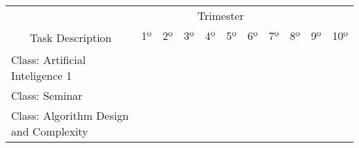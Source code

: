 \begin{table}[h]
\begin{tabular}{lllllllllll}
\hline
\multicolumn{1}{c}{}                                  & \multicolumn{8}{c}{Trimester}                                                                                                                                                                                                             &                                              &                          \\ \cline{2-11} 
\multicolumn{1}{c}{\multirow{2}{*}{Task Description}} & 1º                       & 2º                       & 3º                       & 4º                       & 5º                       & 6º                       & 7º                       & 8º                                           & 9º                                           & 10º                      \\
\multicolumn{1}{c}{}                                  &                          &                          &                          &                          &                          &                          &                          &                                              &                                              &                          \\ \hline
Class: Artificial Inteligence 1                       & \cellcolor[HTML]{9AFF99} & \cellcolor[HTML]{9AFF99} &                          &                          &                          &                          &                          &                                              &                                              &                          \\ \hline
Class: Seminar                                        & \cellcolor[HTML]{9AFF99} & \cellcolor[HTML]{9AFF99} &                          &                          &                          &                          &                          &                                              &                                              &                          \\ \hline
Class: Algorithm Design and Complexity                &                          &                          & \cellcolor[HTML]{9AFF99} & \cellcolor[HTML]{9AFF99} &                          &                          &                          &                                              &                                              &                          \\ \hline

\end{tabular}
\end{table}
